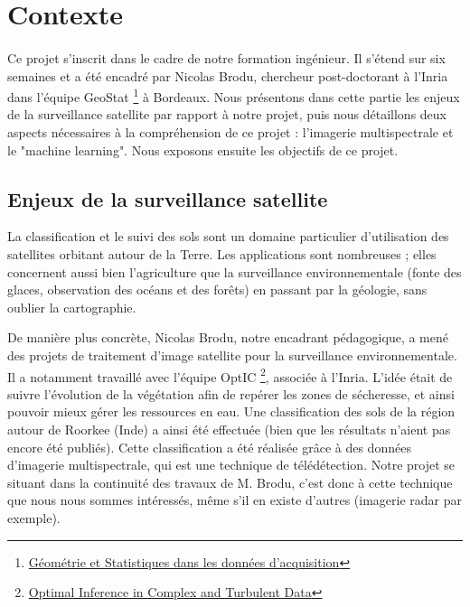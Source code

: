 \paragraph{}

\section{{Contexte}}

\paragraph{}

Ce projet s'inscrit dans le cadre de notre formation ingénieur. Il s'étend sur six semaines et a été encadré par Nicolas Brodu, chercheur post-doctorant à l'Inria dans l'équipe GeoStat \footnote{\href{https://geostat.bordeaux.inria.fr/}{Géométrie et Statistiques dans les données d'acquisition}} à Bordeaux. Nous présentons dans cette partie les enjeux de la surveillance satellite par rapport à notre projet, puis nous détaillons deux aspects nécessaires à la compréhension de ce projet : l'imagerie multispectrale et le "machine learning". Nous exposons ensuite les objectifs de ce projet. 
\paragraph{}

\subsection{Enjeux de la surveillance satellite}
 
La classification et le suivi des sols sont un domaine particulier d'utilisation des satellites orbitant autour de la Terre. 
Les applications sont nombreuses ; elles concernent aussi bien l'agriculture que la surveillance environnementale (fonte des glaces, observation des océans et des forêts) en passant par la géologie, sans oublier la cartographie.

De manière plus concrète, Nicolas Brodu, notre encadrant pédagogique, a mené des projets de traitement d'image satellite pour la surveillance environnementale. Il a notamment travaillé avec l'équipe OptIC \footnote{\href{https://optic.bordeaux.inria.fr/}{Optimal Inference in Complex and Turbulent Data}}, associée à l'Inria. L'idée était de suivre l'évolution de la végétation afin de repérer les zones de sécheresse, et ainsi pouvoir mieux gérer les ressources en eau. Une classification des sols de la région autour de Roorkee (Inde) a ainsi été effectuée (bien que les résultats n'aient pas encore été publiés). 
Cette classification a été réalisée grâce à des données d'imagerie multispectrale, qui est une technique de télédétection. Notre projet se situant dans la continuité des travaux de M. Brodu, c'est donc à cette technique que nous nous sommes intéressés, même s'il en existe d'autres (imagerie radar par exemple). 

